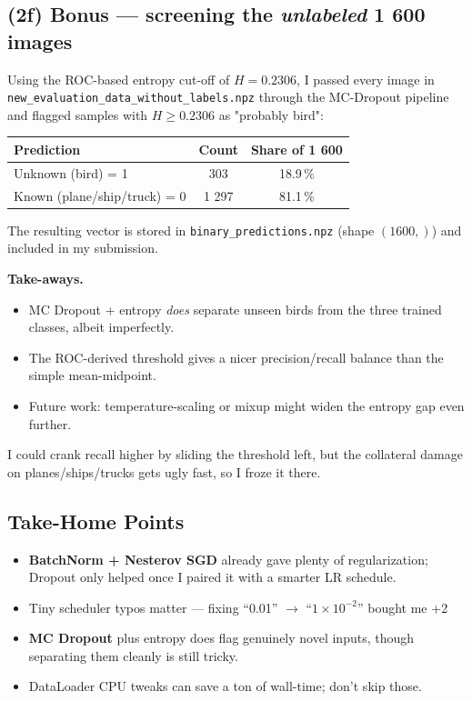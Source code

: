 \documentclass[10pt]{article}
\begin{document}
\subsection*{(2f) Bonus — screening the \emph{unlabeled} 1 600 images}
Using the ROC-based entropy cut-off of \textbf{$H = 0.2306$}, I passed every image in \texttt{new\_evaluation\_data\_without\_labels.npz} through the MC-Dropout pipeline and flagged samples with $H\ge 0.2306$ as "probably bird":
\begin{center}
\begin{tabular}{lcc}
\toprule
Prediction & Count & Share of 1 600 \\
\midrule
Unknown (bird) = 1 & 303  & 18.9\,\% \\
Known (plane/ship/truck) = 0 & 1 297 & 81.1\,\% \\
\bottomrule
\end{tabular}
\end{center}
The resulting vector is stored in \texttt{binary\_predictions.npz} (shape \((1600,)\)) and
included in my submission.

\medskip
\noindent\textbf{Take-aways.}
\begin{itemize}
  \item MC Dropout + entropy \emph{does} separate unseen birds from the three trained classes, albeit imperfectly.
  \item The ROC-derived threshold gives a nicer precision/recall balance than the simple mean-midpoint.
  \item Future work: temperature-scaling or mixup might widen the entropy gap even further.
\end{itemize}
I could crank recall higher by sliding the threshold left, but the collateral damage on planes/ships/trucks gets ugly fast, so I froze it there.
\subsection*{Take-Home Points}
\begin{itemize}
  \item \textbf{BatchNorm + Nesterov SGD} already gave plenty of regularization; Dropout only helped once I paired it with a smarter LR schedule.
  \item Tiny scheduler typos matter — fixing “0.01” $\rightarrow$ “$1\!\times\!10^{-2}$” bought me +2 %
  \item \textbf{MC Dropout} plus entropy does flag genuinely novel inputs, though separating them cleanly is still tricky.
  \item DataLoader CPU tweaks can save a ton of wall-time; don’t skip those.
\end{itemize}
\end{document}
